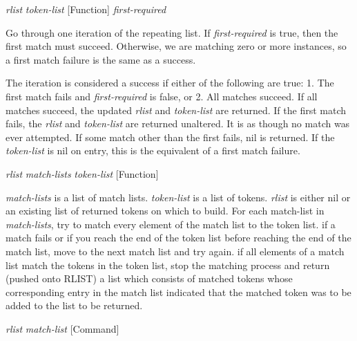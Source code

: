 \vspace{1em}
\noindent
{}
\usebox{\funcname}\emph{rlist} \emph{token-list}
 \hfill [Function]
\hspace*{\wd\funcname}\emph{first-required}

\begin{doc-string}
Go through one iteration of the repeating list.  If \emph{first-required} is true,
then the first match must succeed.  Otherwise, we are matching zero or more
instances, so a first match failure is the same as a success.

The iteration is considered a success if either of the following are true:
1. The first match fails and \emph{first-required} is false, or 2. All matches succeed.
If all matches succeed, the updated \emph{rlist} and \emph{token-list} are returned.  If the
first match fails, the \emph{rlist} and \emph{token-list} are returned unaltered.  It is as
though no match was ever attempted.  If some match other than the first fails,
nil is returned.  If the \emph{token-list} is nil on entry, this is the equivalent of a
first match failure.
\end{doc-string}

\vspace{1em}
\noindent
{}
\usebox{\funcname}\emph{rlist} \emph{match-lists} \emph{token-list}
 \hfill [Function]

\begin{doc-string}
\emph{match-lists} is a list of match lists.  \emph{token-list} is a list of tokens.  \emph{rlist}
is either nil or an existing list of returned tokens on which to build.  For
each match-list in \emph{match-lists}, try to match every element of the match list to
the token list.  if a match fails or if you reach the end of the token list
before reaching the end of the match list, move to the next match list and try
again.  if all elements of a match list match the tokens in the token list, stop
the matching process and return (pushed onto RLIST) a list which consists of
matched tokens whose corresponding entry in the match list indicated that the
matched token was to be added to the list to be returned.
\end{doc-string}

\vspace{1em}
\noindent
{}
\usebox{\funcname}\emph{rlist} \emph{match-list}
 \hfill [Command]
\hspace*{\wd\funcname}

